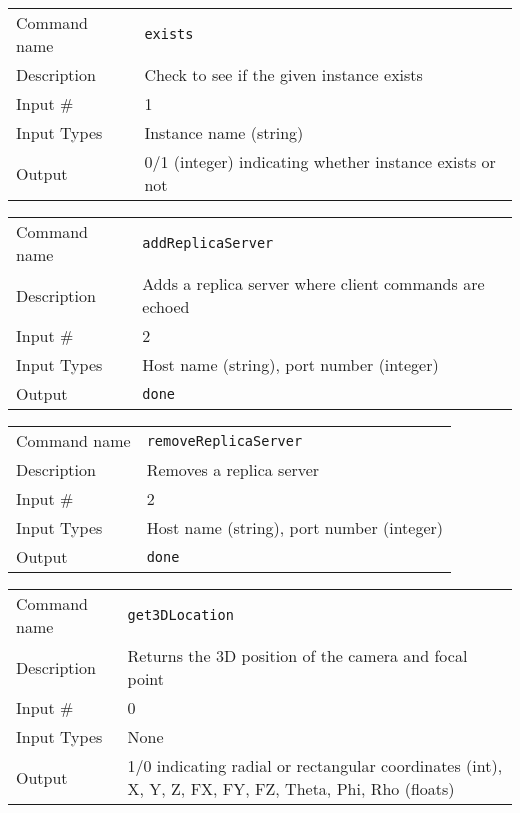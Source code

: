 \bigskip

\noindent
\begin{tabular}{l|p{5in}}
\hline
Command name & {\tt exists} \\
Description  & Check to see if the given instance exists \\
Input \#     & 1 \\
Input Types  & Instance name (string) \\
Output       & 0/1 (integer) indicating whether instance exists or not \\
\hline
\end{tabular}

\bigskip

\noindent
\begin{tabular}{l|p{5in}}
\hline
Command name & {\tt addReplicaServer} \\
Description  & Adds a replica server where client commands are echoed \\
Input \#     & 2 \\
Input Types  & Host name (string), port number (integer) \\
Output       & {\tt done} \\
\hline
\end{tabular}

\bigskip

\noindent
\begin{tabular}{l|p{5in}}
\hline
Command name & {\tt removeReplicaServer} \\
Description  & Removes a replica server \\
Input \#     & 2 \\
Input Types  & Host name (string), port number (integer) \\
Output       & {\tt done} \\
\hline
\end{tabular}

\bigskip

\noindent
\begin{tabular}{l|p{5in}}
\hline
Command name & {\tt get3DLocation} \\
Description  & Returns the 3D position of the camera and focal point \\
Input \#     & 0 \\
Input Types  & None \\
Output       & 1/0 indicating radial or rectangular coordinates (int),
	       X, Y, Z, FX, FY, FZ, Theta, Phi, Rho (floats) \\
\hline
\end{tabular}

